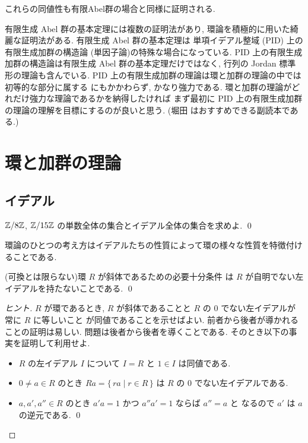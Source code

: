 \documentclass[12pt,twoside]{jarticle}
\begin{document}
これらの同値性も有限Abel群の場合と同様に証明される.

有限生成 Abel 群の基本定理には複数の証明法があり, 
環論を積極的に用いた綺麗な証明法がある.
有限生成 Abel 群の基本定理は
単項イデアル整域 (PID) 上の有限生成加群の構造論
(単因子論)の特殊な場合になっている.
PID 上の有限生成加群の構造論は有限生成 Abel 群の基本定理だけではなく, 
行列の Jordan 標準形の理論も含んでいる.
PID 上の有限生成加群の理論は環と加群の理論の中では初等的な部分に属する
にもかかわらず, かなり強力である.
環と加群の理論がどれだけ強力な理論であるかを納得したければ
まず最初に PID 上の有限生成加群の理論の理解を目標にするのが良いと思う.
(堀田 \cite{hotta-1988} はおすすめできる副読本である.)


\section{環と加群の理論}


\subsection{イデアル}

\begin{question}
 ${\mathbb Z}/8{\mathbb Z}$, ${\mathbb Z}/15{\mathbb Z}$ の単数全体の集合とイデアル全体の集合を求めよ. \qed
\end{question}

環論のひとつの考え方はイデアルたちの性質によって環の様々な性質を特徴付け
ることである.

\begin{question}[斜体のイデアルを用いた特徴付け]
 (可換とは限らない)環 $R$ が斜体であるための必要十分条件
 は $R$ が自明でない左イデアルを持たないことである.
 \qed
\end{question}

\begin{proof}[ヒント]
 $R$ が環であるとき, 
 $R$ が斜体であることと $R$ の $0$ でない左イデアルが常に $R$ に等しいこと
 が同値であることを示せばよい.
 前者から後者が導かれることの証明は易しい.
 問題は後者から後者を導くことである.
 そのとき以下の事実を証明して利用せよ.
 \begin{itemize}
  \item $R$ の左イデアル $I$ について $I=R$ と $1\in I$ は同値である.
  \item $0\ne a\in R$ のとき $Ra=\{\,ra\mid r\in R\,\}$ 
   は $R$ の $0$ でない左イデアルである.
  \item $a,a',a''\in R$ のとき %
   $a'a=1$ かつ $a''a'=1$ ならば $a''=a$ と
   なるので $a'$ は $a$ の逆元である.
 \qed
 \end{itemize}
\end{proof}
\end{document}
